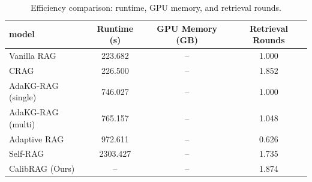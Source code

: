 \begin{table}
\caption{Efficiency comparison: runtime, GPU memory, and retrieval rounds.}
\label{tab:efficiency_results}
\begin{tabular}{lccc}
\toprule
model & Runtime (s) & GPU Memory (GB) & Retrieval Rounds \\
\midrule
Vanilla RAG & 223.682 & -- & 1.000 \\
CRAG & 226.500 & -- & 1.852 \\
AdaKG-RAG (single) & 746.027 & -- & 1.000 \\
AdaKG-RAG (multi) & 765.157 & -- & 1.048 \\
Adaptive RAG & 972.611 & -- & 0.626 \\
Self-RAG & 2303.427 & -- & 1.735 \\
CalibRAG (Ours) & -- & -- & 1.874 \\
\bottomrule
\end{tabular}
\end{table}
